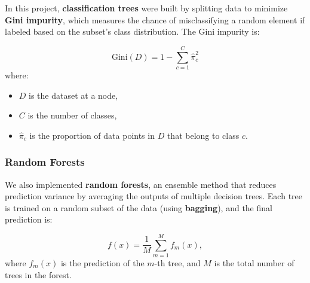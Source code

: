 \documentclass[fleqn,moreauthors,10pt]{ds_report}
\begin{document}
In this project, \textbf{classification trees} were built by splitting data to minimize \textbf{Gini impurity}, which measures the chance of misclassifying a random element if labeled based on the subset's class distribution\cite{MLPP}. The Gini impurity is:

\[
\text{Gini}(D) = 1 - \sum_{c=1}^{C} \hat{\pi}_c^2
\]
where:
\begin{itemize}
    \item \( D \) is the dataset at a node,
    \item \( C \) is the number of classes,
    \item \( \hat{\pi}_c \) is the proportion of data points in \( D \) that belong to class \( c \).
\end{itemize}

%
%

\subsubsection*{Random Forests}

We also implemented \textbf{random forests}, an ensemble method that reduces prediction variance by averaging the outputs of multiple decision trees. Each tree is trained on a random subset of the data (using \textbf{bagging})\cite{MLPP}, and the final prediction is:

\[
f(x) = \frac{1}{M} \sum_{m=1}^{M} f_m(x),
\]
where \( f_m(x) \) is the prediction of the \( m \)-th tree, and \( M \) is the total number of trees in the forest.
%
%
\end{document}
